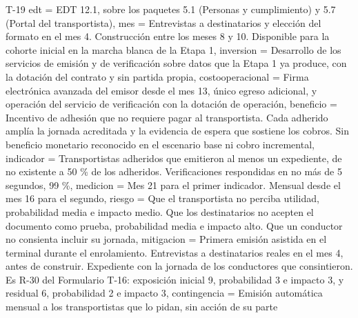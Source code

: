 \begin{formulario}{T-19}
{  edt = {EDT 12.1, sobre los paquetes 5.1 (Personas y cumplimiento) y 5.7 (Portal del transportista)},
  mes = {Entrevistas a destinatarios y elección del formato en el mes 4. Construcción entre los meses 8 y 10. Disponible para la cohorte inicial en la marcha blanca de la Etapa 1},
  inversion = {Desarrollo de los servicios de emisión y de verificación sobre datos que la Etapa 1 ya produce, con la dotación del contrato y sin partida propia},
  costooperacional = {Firma electrónica avanzada del emisor desde el mes 13, único egreso adicional, y operación del servicio de verificación con la dotación de operación},
  beneficio = {Incentivo de adhesión que no requiere pagar al transportista. Cada adherido amplía la jornada acreditada y la evidencia de espera que sostiene los cobros. Sin beneficio monetario reconocido en el escenario base ni cobro incremental},
  indicador = {Transportistas adheridos que emitieron al menos un expediente, de no existente a 50 \% de los adheridos. Verificaciones respondidas en no más de 5 segundos, 99 \%},
  medicion = {Mes 21 para el primer indicador. Mensual desde el mes 16 para el segundo},
  riesgo = {Que el transportista no perciba utilidad, probabilidad media e impacto medio. Que los destinatarios no acepten el documento como prueba, probabilidad media e impacto alto. Que un conductor no consienta incluir su jornada},
  mitigacion = {Primera emisión asistida en el terminal durante el enrolamiento. Entrevistas a destinatarios reales en el mes 4, antes de construir. Expediente con la jornada de los conductores que consintieron. Es R-30 del Formulario T-16: exposición inicial 9, probabilidad 3 e impacto 3, y residual 6, probabilidad 2 e impacto 3},
  contingencia = {Emisión automática mensual a los transportistas que lo pidan, sin acción de su parte}
}
\clearpage
{}
\end{formulario}
